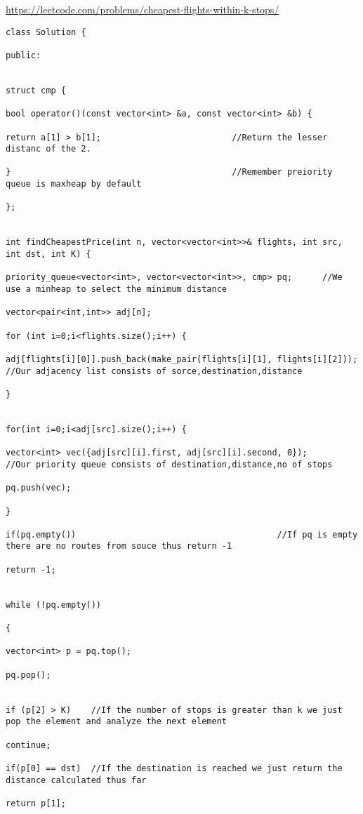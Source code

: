 \documentclass[12pt]{article}
\begin{document}
\begin{enumerate}
   \url{https://leetcode.com/problems/cheapest-flights-within-k-stops/}

\begin{verbatim}
class Solution {

public:


struct cmp {

bool operator()(const vector<int> &a, const vector<int> &b) {

return a[1] > b[1];                          //Return the lesser distanc of the 2.

}                                            //Remember preiority queue is maxheap by default

};


int findCheapestPrice(int n, vector<vector<int>>& flights, int src, int dst, int K) {

priority_queue<vector<int>, vector<vector<int>>, cmp> pq;      //We use a minheap to select the minimum distance

vector<pair<int,int>> adj[n];

for (int i=0;i<flights.size();i++) {

adj[flights[i][0]].push_back(make_pair(flights[i][1], flights[i][2]));   //Our adjacency list consists of sorce,destination,distance

}


for(int i=0;i<adj[src].size();i++) {

vector<int> vec({adj[src][i].first, adj[src][i].second, 0});      //Our priority queue consists of destination,distance,no of stops

pq.push(vec);

}

if(pq.empty())                                        //If pq is empty there are no routes from souce thus return -1

return -1;


while (!pq.empty())

{

vector<int> p = pq.top();

pq.pop();


if (p[2] > K)    //If the number of stops is greater than k we just pop the element and analyze the next element

continue;

if(p[0] == dst)  //If the destination is reached we just return the distance calculated thus far

return p[1];



\end{verbatim}
\end{enumerate}
\end{document}
